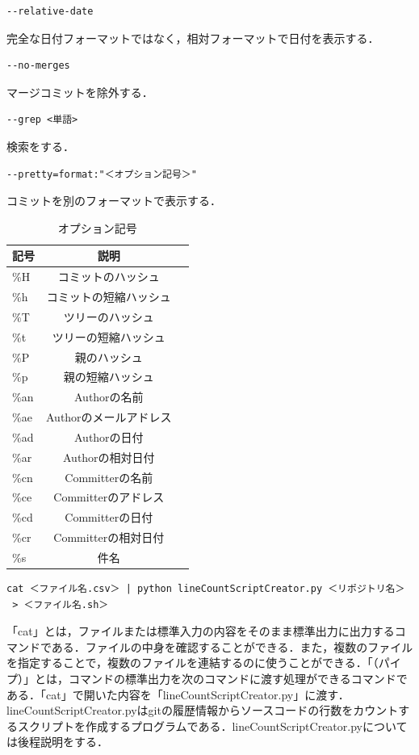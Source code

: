{
\small
\begin{verbatim}
--relative-date
\end{verbatim}
}
完全な日付フォーマットではなく，相対フォーマットで日付を表示する．

{
\small
\begin{verbatim}
--no-merges
\end{verbatim}
}
マージコミットを除外する．

{
\small
\begin{verbatim}
--grep <単語>
\end{verbatim}
}
検索をする．

{
\small
\begin{verbatim}
--pretty=format:"＜オプション記号＞"
\end{verbatim}
}
コミットを別のフォーマットで表示する．
\begin{table}[hbtp]
\caption{オプション記号}
\label{table:data_type}
\centering
\begin{tabular}{lcr}
\hline
記号 & 説明 \\
\hline
\hline
\%H & コミットのハッシュ \\
\%h & コミットの短縮ハッシュ \\
\%T & ツリーのハッシュ \\
\%t & ツリーの短縮ハッシュ \\
\%P & 親のハッシュ \\
\%p & 親の短縮ハッシュ \\
\%an & Authorの名前 \\
\%ae & Authorのメールアドレス \\
\%ad & Authorの日付 \\
\%ar & Authorの相対日付 \\
\%cn & Committerの名前 \\
\%ce & Committerのアドレス \\
\%cd & Committerの日付 \\
\%cr & Committerの相対日付 \\
\%s & 件名 \\
\hline
\end{tabular}
\end{table}

\newpage

\begin{lstlisting}[basicstyle=\ttfamily\footnotesize, frame=single]
cat ＜ファイル名.csv＞ | python lineCountScriptCreator.py ＜リポジトリ名＞
 > ＜ファイル名.sh＞
\end{lstlisting}
「cat」とは，ファイルまたは標準入力の内容をそのまま標準出力に出力するコマンドである．ファイルの中身を確認することができる．また，複数のファイルを指定することで，複数のファイルを連結するのに使うことができる．「\textbar（パイプ）」とは，コマンドの標準出力を次のコマンドに渡す処理ができるコマンドである．「cat」で開いた内容を「lineCountScriptCreator.py」に渡す．lineCountScriptCreator.pyはgitの履歴情報からソースコードの行数をカウントするスクリプトを作成するプログラムである．lineCountScriptCreator.pyについては後程説明をする．

